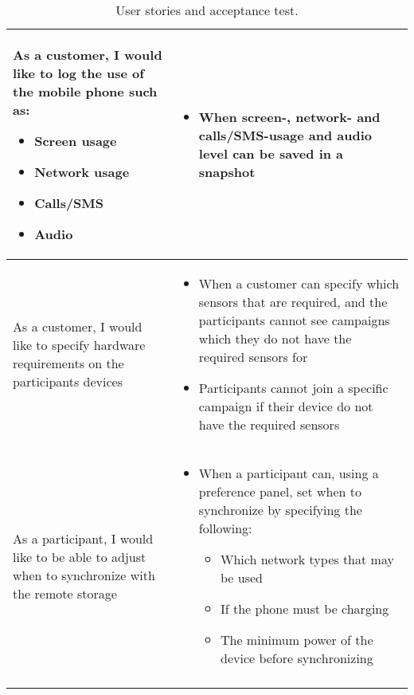 \begin{center}
\begin{longtable}{| m{} | m{} |}
	As a customer, I would like to log the use of the mobile phone such as:
	\begin{itemize}[noitemsep,topsep=0pt,parsep=0pt,partopsep=0pt]
		\item Screen usage 
		\item Network usage 
		\item Calls/SMS
		\item Audio
	\end{itemize} & 
	\begin{itemize}
		\item When screen-, network- and calls/SMS-usage and audio level can be saved in a snapshot
	\end{itemize} \\ \hline
	As a customer, I would like to specify hardware requirements on the participants devices &
	\begin{itemize}[noitemsep,topsep=0pt,parsep=0pt,partopsep=0pt]
		\item When a customer can specify which sensors that are required, and the participants cannot see campaigns which they do not have the required sensors for
		\item Participants cannot join a specific campaign if their device do not have the required sensors
	\end{itemize} \\ \hline
	As a participant, I would like to be able to adjust when to synchronize with the remote storage &
	\begin{itemize}[noitemsep,topsep=0pt,parsep=0pt,partopsep=0pt]
	 	\item When a participant can, using a preference panel, set when to synchronize by specifying the following:
	 	\begin{itemize}[noitemsep,topsep=0pt,parsep=0pt,partopsep=0pt]
	 		\item Which network types that may be used
	 		\item If the phone must be charging
	 		\item The minimum power of the device before synchronizing
	 	\end{itemize}
	 \end{itemize} \\ \hline
\caption{User stories and acceptance test.}
\label{tab:user_stories_and_acceptance_test}
\end{longtable}
\end{center}



